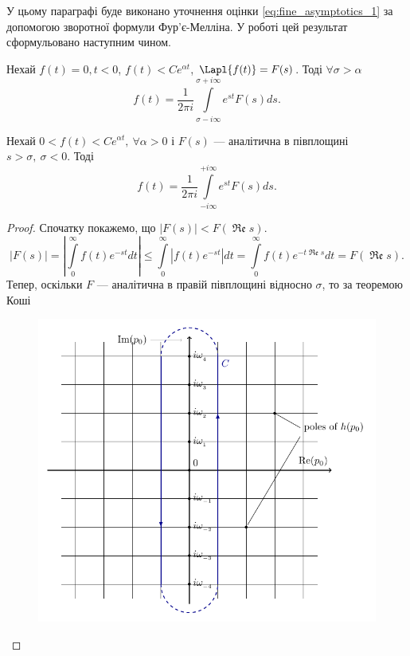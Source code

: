 У цьому параграфі буде виконано уточнення оцінки \eqref{eq:fine_asymptotics_1} за допомогою зворотної формули Фур'є-Мелліна. У роботі \cite{schiff1999laplace} цей результат сформульовано наступним чином.
\begin{thm}
\label{eq:mellin_thm}
Нехай $f(t) = 0, t < 0$,  $f(t) < Ce^{\alpha t}$, $\Lapl{f(t)} = F(s)$. Тоді $\forall \sigma > \alpha$
\begin{equation}
f(t) = \frac{1}{2\pi i}\int\limits_{\sigma - i\infty}^{\sigma + i\infty} e^{st} F(s) ds.
\end{equation}
\end{thm}
\begin{corollary}
\label{eq:mellin_analytic}
Нехай $0 < f(t) < Ce^{\alpha t}, ~ \forall \alpha > 0$ і $F(s)$ --- аналітична в півплощині $s > \sigma, ~\sigma < 0$. Тоді
\begin{equation}
f(t) = \frac{1}{2\pi i}\int\limits_{- i\infty}^{+ i\infty} e^{st} F(s) ds.
\end{equation}
\begin{proof}
Спочатку покажемо, що $|F(s)| < F(\operatorname{\mathfrak{Re}} s)$.
\begin{equation*}
|F(s)| = \left| \int\limits_{0}^{\infty}  f(t) e^{-st} dt \right| \leq \int\limits_{0}^{\infty} \left|f(t) e^{-st} \right| dt = \int\limits_{0}^{\infty} f(t)  e^{-t\operatorname{\mathfrak{Re}} s}  dt = F(\operatorname{\mathfrak{Re}} s).
\end{equation*}
Тепер, оскільки $F$ --- аналітична в правій півплощині відносно $\sigma$, то за теоремою Коші \cite{lavrentiev1965}
\begin{figure}[h]
	\centering
	\includegraphics{chapter_Asymptotics/img/contour_bar}

\end{figure}
\end{proof}
\end{corollary}
